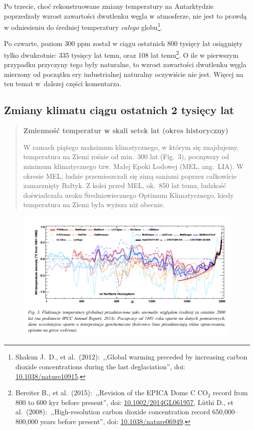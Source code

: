 \documentclass[12pt]{article}
\newcommand{\doi}[1]{doi: \href{htts://doi.org/#1}{#1}}
\begin{document}
Po trzecie, choć rekonstruowane zmiany temperatury na Antarktydzie poprzedzały wzrost zawartości dwutlenku węgla w atmosferze, nie jest to prawdą w odniesieniu do średniej temperatury \emph{całego} globu\footnote{Shakun J.~D., et al.~(2012):~,,Global warming preceded by increasing carbon dioxide concentrations during the last deglaciation'', \doi{10.1038/nature10915}.}.

Po czwarte, poziom 300 ppm został w ciągu ostatnich 800 tysięcy lat osiągnięty tylko dwukrotnie: 335 tysięcy lat temu, oraz 108 lat temu\footnote{Bereiter B., et al.~(2015):~,,Revision of the EPICA Dome C CO$_2$ record from 800 to 600 kyr before present'', \doi{10.1002/2014GL061957}, L\"{u}thi D., et al.~(2008):~,,High-resolution carbon dioxide concentration record 650,000--800,000 years before present'', \doi{10.1038/nature06949}.}. O ile w pierwszym przypadku przyczyny tego były naturalne, to wzrost zawartości dwutlenku węgla mierzony od początku ery industrialnej naturalny oczywiście nie jest. Więcej na ten temat w~dalszej części komentarza.

\newpage

\subsection*{Zmiany klimatu ciągu ostatnich 2 tysięcy lat}

\begin{quotation}
	\textbf{Zmienność temperatur w skali setek lat (okres historyczny)}

	W ramach piątego maksimum klimatycznego, w którym się znajdujemy, temperatura na Ziemi rośnie od min.~300 lat (Fig.~3), począwszy od minimum klimatycznego tzw. Małej Epoki Lodowej (MEL, ang.~LIA). W okresie MEL, ludzie przemieszczali się zimą saniami poprzez całkowicie zamarznięty Bałtyk. Z kolei przed MEL, ok.~850 lat temu, ludzkość doświadczała  uroku Średniowiecznego Optimum Klimatycznego, kiedy temperatura na Ziemi była wyższa niż obecnie.
\end{quotation}

\begin{figure}
	\centering
	
	\includegraphics[width=.95\textwidth]{img/kng2.png}	
\end{figure}
\end{document}

